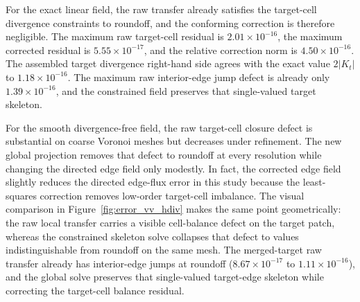 \documentclass[11pt]{article}
\begin{document}
For the exact linear field, the raw transfer already satisfies the target-cell
divergence constraints to roundoff, and the conforming correction is therefore
negligible.  The maximum raw target-cell residual is
\(2.01\times10^{-16}\), the maximum corrected residual is
\(5.55\times10^{-17}\), and the relative correction norm is
\(4.50\times10^{-16}\).  The assembled target divergence right-hand side agrees
with the exact value \(2|K_t|\) to \(1.18\times10^{-16}\).  The maximum raw
interior-edge jump defect is already only \(1.39\times10^{-16}\), and the
constrained field preserves that single-valued target skeleton.

For the smooth divergence-free field, the raw target-cell closure defect is
substantial on coarse Voronoi meshes but decreases under refinement.  The new
global projection removes that defect to roundoff at every resolution while
changing the directed edge field only modestly.  In fact, the corrected edge
field slightly reduces the directed edge-flux error in this study because the
least-squares correction removes low-order target-cell imbalance.  The
visual comparison in Figure~\ref{fig:error_vv_hdiv} makes the same point
geometrically: the raw local transfer carries a visible cell-balance defect on
the target patch, whereas the constrained skeleton solve collapses that defect
to values indistinguishable from roundoff on the same mesh.  The merged-target
raw transfer already has interior-edge jumps at roundoff
(\(8.67\times10^{-17}\) to \(1.11\times10^{-16}\)), and the global solve
preserves that single-valued target-edge skeleton while correcting the
target-cell balance residual.
\end{document}
